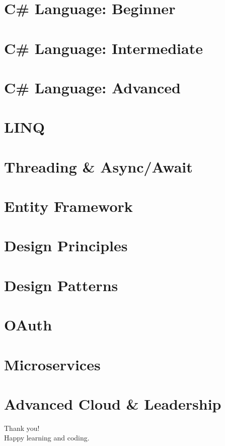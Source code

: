 \documentclass{mybeamer}
\begin{document}
\hypertarget{sec1}{}
\section{C\# Language: Beginner}


\hypertarget{sec2}{}
\section{C\# Language: Intermediate}


\hypertarget{sec3}{}
\section{C\# Language: Advanced}


\hypertarget{sec4}{}
\section{LINQ}


\hypertarget{sec5}{}
\section{Threading \& Async/Await}


\hypertarget{sec6}{}
\section{Entity Framework}


\hypertarget{sec7}{}
\section{Design Principles}


\hypertarget{sec8}{}
\section{Design Patterns}


\hypertarget{sec9}{}
\section{OAuth}


\hypertarget{sec10}{}
\section{Microservices}


\hypertarget{sec11}{}
\section{Advanced Cloud \& Leadership}


\begin{frame}
  \centering
  {\Huge Thank you!}\\[0.5em]
  Happy learning and coding.
\end{frame}
\end{document}
